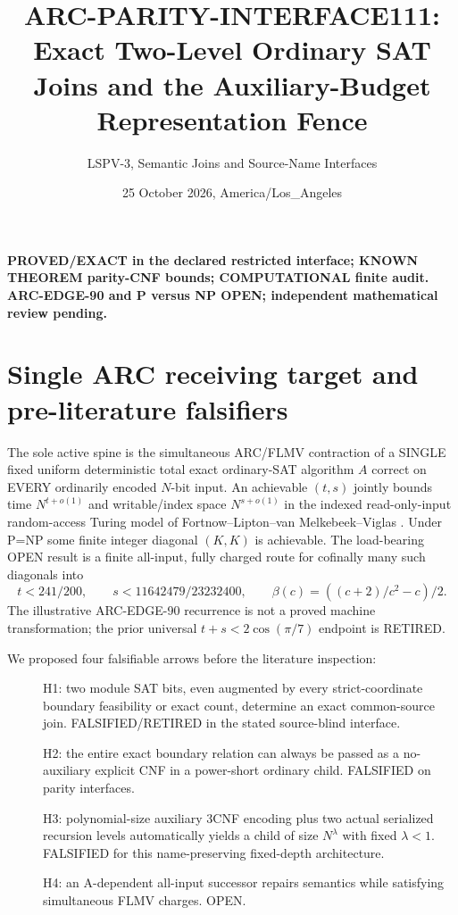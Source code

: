 \documentclass[11pt]{article}
\title{ARC-PARITY-INTERFACE111: Exact Two-Level Ordinary SAT Joins and the Auxiliary-Budget Representation Fence}
\author{LSPV-3, Semantic Joins and Source-Name Interfaces}
\date{25 October 2026, America/Los\_Angeles}
\begin{document}
\maketitle
\begin{center}
\textbf{PROVED/EXACT in the declared restricted interface; KNOWN THEOREM parity-CNF bounds; COMPUTATIONAL finite audit.}\\
\textbf{ARC-EDGE-90 and P versus NP OPEN; independent mathematical review pending.}
\end{center}

\section{Single ARC receiving target and pre-literature falsifiers}
The sole active spine is the simultaneous ARC/FLMV contraction of a SINGLE fixed uniform deterministic total exact ordinary-SAT algorithm $A$ correct on EVERY ordinarily encoded $N$-bit input. An achievable $(t,s)$ jointly bounds time $N^{t+o(1)}$ and writable/index space $N^{s+o(1)}$ in the indexed read-only-input random-access Turing model of Fortnow--Lipton--van Melkebeek--Viglas \cite{flmv}. Under P=NP some finite integer diagonal $(K,K)$ is achievable. The load-bearing OPEN result is a finite all-input, fully charged route for cofinally many such diagonals into
\[
 t<241/200,\qquad s<11642479/23232400,\qquad
 \beta(c)=((c+2)/c^2-c)/2.
\]
The illustrative ARC-EDGE-90 recurrence is not a proved machine transformation; the prior universal $t+s<2\cos(\pi/7)$ endpoint is RETIRED.

We proposed four falsifiable arrows before the literature inspection:
\begin{description}
\item[] H1: two module SAT bits, even augmented by every strict-coordinate boundary feasibility or exact count, determine an exact common-source join. FALSIFIED/RETIRED in the stated source-blind interface.
\item[] H2: the entire exact boundary relation can always be passed as a no-auxiliary explicit CNF in a power-short ordinary child. FALSIFIED on parity interfaces.
\item[] H3: polynomial-size auxiliary 3CNF encoding plus two actual serialized recursion levels automatically yields a child of size $N^\lambda$ with fixed $\lambda<1$. FALSIFIED for this name-preserving fixed-depth architecture.
\item[] H4: an A-dependent all-input successor repairs semantics while satisfying simultaneous FLMV charges. OPEN.
\end{description}
\end{document}
